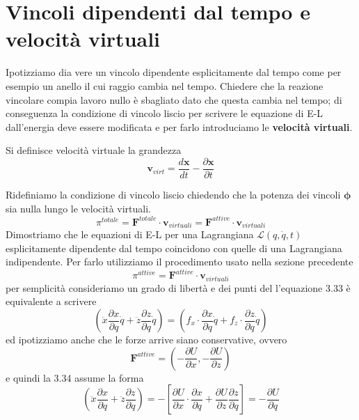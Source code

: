 \section{Vincoli dipendenti dal tempo e velocit\`{a} virtuali}
Ipotizziamo dia vere un vincolo dipendente esplicitamente dal tempo come per esempio un anello il cui raggio cambia nel tempo. Chiedere che la reazione vincolare compia lavoro nullo \`{e} sbagliato dato che questa cambia nel tempo; di conseguenza la condizione di vincolo liscio per scrivere le equazione di E-L dall'energia deve essere modificata e per farlo introduciamo le \textbf{velocit\`{a} virtuali}.
\begin{definition}
	Si definisce velocit\`{a} virtuale la grandezza 
	\begin{equation}
		\bm{v}_{virt} = \frac{d \bm{x}}{dt}-\frac{\partial \bm{x}}{\partial t}
	\end{equation}
\end{definition}
Ridefiniamo la condizione di vincolo liscio chiedendo che la potenza dei vincoli $\bm{\phi}$ sia nulla lungo le velocit\`{a} virtuali.
\begin{equation}
	\pi^{totale} = \bm{F}^{totale} \cdot \bm{v}_{virtuali} = \bm{F}^{attive} \cdot \bm{v}_{virtuali}
\end{equation}
Dimostriamo che le equazioni di E-L per una Lagrangiana $\mathcal{L}(q,\dot{q},t)$ esplicitamente dipendente dal tempo coincidono con quelle di una Lagrangiana indipendente. Per farlo utilizziamo il procedimento usato nella sezione precedente
\begin{equation}
	\pi^{attive} = \bm{F}^{attive} \cdot \bm{v}_{virtuali} 
\end{equation}
per semplicit\`{a} consideriamo un grado di libert\`{a} e dei punti del l'equazione 3.33 \`{e} equivalente a scrivere 
\begin{equation}
\left(\ddot{x} \frac{\partial x}{\partial q} \dot{q}+\ddot{z} \frac{\partial z}{\partial q} \dot{q}\right)=\left(f_x \cdot \frac{\partial x}{\partial q} \dot{q}+f_z \cdot \frac{\partial z}{\partial q} \dot{q}\right)
\end{equation}
ed ipotizziamo anche che le forze arrive siano conservative, ovvero
\begin{equation}
\bm{F}^{attive}=\left(-\frac{\partial U}{\partial x},-\frac{\partial U}{\partial z}\right)
\end{equation}
e quindi la 3.34 assume la forma 
\begin{equation}
\left(\ddot{x} \frac{\partial x}{\partial q}+\ddot{z} \frac{\partial z}{\partial q}\right)=-\left[\frac{\partial U}{\partial x} \cdot \frac{\partial x}{\partial q}+\frac{\partial U}{\partial z} \frac{\partial z}{\partial q}\right] = - \frac{\partial U}{\partial q}
\end{equation}
